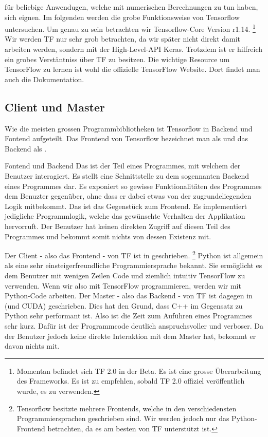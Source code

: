 für beliebige Anwendugen, welche mit numerischen Berechnungen zu tun haben,
sich eignen.
\para{}
Im folgenden werden die grobe Funktionsweise von Tensorflow untersuchen. Um
genau zu sein betrachten wir Tensorflow-Core Version r1.14.
\footnote{Momentan befindet sich TF 2.0 in der Beta. Es ist eine grosse
  Überarbeitung des Frameworks. Es ist zu empfehlen, sobald TF 2.0 offiziel
  veröffentlich wurde, es zu verwenden.}
Wir werden TF nur sehr grob betrachten, da wir später nicht direkt damit
arbeiten werden, sondern mit der High-Level-API Keras. Trotzdem ist er hilfreich
ein grobes Verstäntniss über TF zu besitzen.
\para{}
Die wichtige Resource um TensorFlow zu lernen ist wohl die offizielle TensorFlow
Website. Dort findet man auch die Dokumentation.
\para{}

\para{}
\cite{book:tensorflow}

\subsection{Client und Master}
Wie die meisten grossen Programmbibliotheken ist Tensorflow in Backend und
Fontend aufgeteilt. Das Frontend von Tensorflow bezeichnet man als
 und das Backend als .
\para{}
\begin{infobox}{Fontend und Backend}
  Das  ist der Teil eines Programmes, mit welchem der Benutzer
  interagiert. Es stellt eine Schnittstelle zu dem sogennanten Backend eines
  Programmes dar. Es exponiert so gewisse Funktionalitäten des Programmes dem
  Benuzter gegenüber, ohne dass er dabei etwas von der zugrundeliegenden Logik mitbekommt.
  \para{}
  Das  ist das Gegenstück zum Frontend. Es implementiert
  jedigliche Programmlogik, welche das gewünschte Verhalten der Applikation
  hervorruft. Der Benutzer hat keinen direkten Zugriff auf diesen Teil des
  Programmes und bekommt somit nichts von dessen Existenz mit.
\end{infobox}
\para{}
Der Client - also das Frontend - von TF ist in  geschrieben.
\footnote{
  Tensorflow besitzte mehrere Frontends, welche in den verschiedensten
  Programmiersprachen geschrieben sind. Wir werden jedoch nur das
  Python-Frontend betrachten, da es am besten von TF unterstützt ist.
}
Python ist allgemein als eine sehr einsteigerfreundliche Programmiersprache bekannt. Sie
ermöglicht es dem Benutzer mit wenigen Zeilen Code und ziemlich intuitiv
TensorFlow zu verwenden. Wenn wir also mit TensorFlow programmieren, werden wir
mit Python-Code arbeiten.
\para{}
Der Master - also das Backend - von TF ist dagegen in  (und CUDA)
geschrieben. Dies hat den Grund, dass C++ im Gegensatz zu Python sehr performant
ist. Also ist die Zeit zum Auführen eines Programmes sehr kurz. Dafür ist der
Programmcode deutlich anspruchsvoller und verboser. Da der Benutzer jedoch keine
direkte Interaktion mit dem Master hat, bekommt er davon nichts mit.

